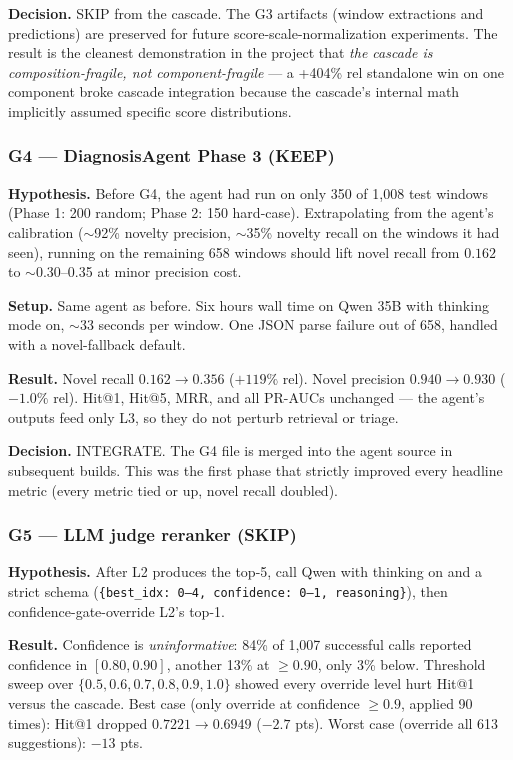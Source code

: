 \textbf{Decision.} SKIP from the cascade. The G3 artifacts (window extractions and predictions) are preserved for future score-scale-normalization experiments. The result is the cleanest demonstration in the project that \emph{the cascade is composition-fragile, not component-fragile} --- a +404\% rel standalone win on one component broke cascade integration because the cascade's internal math implicitly assumed specific score distributions.

\subsubsection{G4 --- DiagnosisAgent Phase 3 (KEEP)}

\textbf{Hypothesis.} Before G4, the agent had run on only 350 of 1{,}008 test windows (Phase 1: 200 random; Phase 2: 150 hard-case). Extrapolating from the agent's calibration ($\sim$92\% novelty precision, $\sim$35\% novelty recall on the windows it had seen), running on the remaining 658 windows should lift novel recall from $0.162$ to $\sim$0.30--0.35 at minor precision cost.

\textbf{Setup.} Same agent as before. Six hours wall time on Qwen 35B with thinking mode on, $\sim$33 seconds per window. One JSON parse failure out of 658, handled with a novel-fallback default.

\textbf{Result.} Novel recall $0.162 \to 0.356$ ($+119\%$ rel). Novel precision $0.940 \to 0.930$ ($-1.0\%$ rel). Hit@1, Hit@5, MRR, and all PR-AUCs unchanged --- the agent's outputs feed only L3, so they do not perturb retrieval or triage.

\textbf{Decision.} INTEGRATE. The G4 file is merged into the agent source in subsequent builds. This was the first phase that strictly improved every headline metric (every metric tied or up, novel recall doubled).

\subsubsection{G5 --- LLM judge reranker (SKIP)}

\textbf{Hypothesis.} After L2 produces the top-5, call Qwen with thinking on and a strict schema (\texttt{\{best\_idx: 0--4, confidence: 0--1, reasoning\}}), then confidence-gate-override L2's top-1.

\textbf{Result.} Confidence is \emph{uninformative}: 84\% of 1{,}007 successful calls reported confidence in $[0.80, 0.90]$, another 13\% at $\geq 0.90$, only 3\% below. Threshold sweep over $\{0.5, 0.6, 0.7, 0.8, 0.9, 1.0\}$ showed every override level hurt Hit@1 versus the cascade. Best case (only override at confidence $\geq 0.9$, applied 90 times): Hit@1 dropped $0.7221 \to 0.6949$ ($-2.7$ pts). Worst case (override all 613 suggestions): $-13$ pts.


